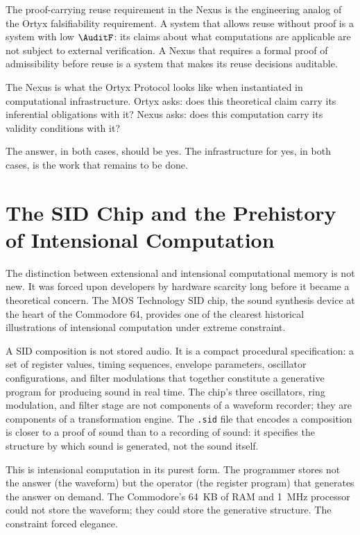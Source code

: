 The proof-carrying reuse requirement in the Nexus is
the engineering analog of the Ortyx falsifiability
requirement. A system that allows reuse without proof
is a system with low $\AuditF$: its claims about
what computations are applicable are not subject to
external verification. A Nexus that requires a formal
proof of admissibility before reuse is a system that
makes its reuse decisions auditable.

\begin{interlude}
  The Nexus is what the Ortyx Protocol looks like when
  instantiated in computational infrastructure. Ortyx
  asks: does this theoretical claim carry its inferential
  obligations with it? Nexus asks: does this computation
  carry its validity conditions with it?

  The answer, in both cases, should be yes.
  The infrastructure for yes, in both cases,
  is the work that remains to be done.
\end{interlude}

\section{The SID Chip and the Prehistory of Intensional Computation}
\label{sec:sid-prehistory}

The distinction between extensional and intensional
computational memory is not new. It was forced upon
developers by hardware scarcity long before it became
a theoretical concern. The MOS Technology SID chip,
the sound synthesis device at the heart of the Commodore
64, provides one of the clearest historical illustrations
of intensional computation under extreme constraint.

A SID composition is not stored audio. It is a compact
procedural specification: a set of register values,
timing sequences, envelope parameters, oscillator
configurations, and filter modulations that together
constitute a generative program for producing sound
in real time. The chip's three oscillators, ring
modulation, and filter stage are not components of
a waveform recorder; they are components of a
transformation engine. The \texttt{.sid} file that
encodes a composition is closer to a proof of sound
than to a recording of sound: it specifies the structure
by which sound is generated, not the sound itself.

This is intensional computation in its purest form.
The programmer stores not the answer (the waveform)
but the operator (the register program) that generates
the answer on demand. The Commodore's 64~KB of RAM
and 1~MHz processor could not store the waveform;
they could store the generative structure. The
constraint forced elegance.

